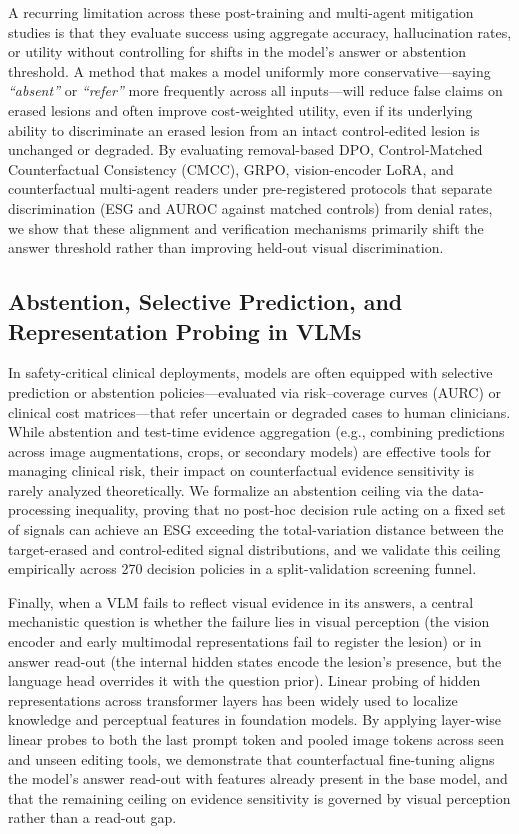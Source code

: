 \documentclass{article} %
\begin{document}
A recurring limitation across these post-training and multi-agent mitigation studies is that they evaluate success using aggregate accuracy, hallucination rates, or utility without controlling for shifts in the model's answer or abstention threshold. A method that makes a model uniformly more conservative---saying \emph{``absent''} or \emph{``refer''} more frequently across all inputs---will reduce false claims on erased lesions and often improve cost-weighted utility, even if its underlying ability to discriminate an erased lesion from an intact control-edited lesion is unchanged or degraded. By evaluating removal-based DPO, Control-Matched Counterfactual Consistency (CMCC), GRPO, vision-encoder LoRA, and counterfactual multi-agent readers under pre-registered protocols that separate discrimination (ESG and AUROC against matched controls) from denial rates, we show that these alignment and verification mechanisms primarily shift the answer threshold rather than improving held-out visual discrimination.

\subsection{Abstention, Selective Prediction, and Representation Probing in VLMs}
\label{subsec:rw_abstention}
In safety-critical clinical deployments, models are often equipped with selective prediction or abstention policies---evaluated via risk--coverage curves (AURC) \citep{geifman2017selective} or clinical cost matrices---that refer uncertain or degraded cases to human clinicians. While abstention and test-time evidence aggregation (e.g., combining predictions across image augmentations, crops, or secondary models) are effective tools for managing clinical risk, their impact on counterfactual evidence sensitivity is rarely analyzed theoretically. We formalize an abstention ceiling via the data-processing inequality, proving that no post-hoc decision rule acting on a fixed set of signals can achieve an ESG exceeding the total-variation distance between the target-erased and control-edited signal distributions, and we validate this ceiling empirically across 270 decision policies in a split-validation screening funnel.

Finally, when a VLM fails to reflect visual evidence in its answers, a central mechanistic question is whether the failure lies in visual perception (the vision encoder and early multimodal representations fail to register the lesion) or in answer read-out (the internal hidden states encode the lesion's presence, but the language head overrides it with the question prior). Linear probing of hidden representations across transformer layers \citep{alain2016understanding} has been widely used to localize knowledge and perceptual features in foundation models. By applying layer-wise linear probes to both the last prompt token and pooled image tokens across seen and unseen editing tools, we demonstrate that counterfactual fine-tuning aligns the model's answer read-out with features already present in the base model, and that the remaining ceiling on evidence sensitivity is governed by visual perception rather than a read-out gap.
\end{document}
